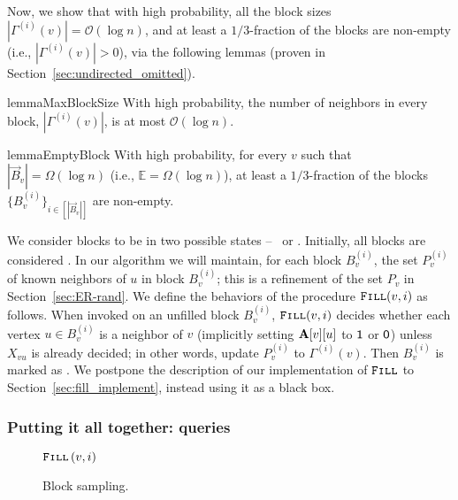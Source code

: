 Now, we show that with high probability, all the block sizes $|\Gamma^{(i)}(v)|=\mathcal{O}(\log n)$, and at least a $1/3$-fraction of the blocks are non-empty (i.e., $|\Gamma^{(i)}(v)|>0$), via the following lemmas (proven in Section~\ref{sec:undirected_omitted}).

\begin{restatable}{lemma}{MaxBlockSize}
\label{lem:MaxBlockSize}
With high probability, the number of neighbors in every block, $|\Gamma^{(i)}(v)|$, is at most $ \mathcal{O}(\log n)$.
\end{restatable}

\begin{restatable}{lemma}{EmptyBlock}
\label{lem:EmptyBlock}
With high probability, for every $v$ such that $|\vec B_v| = \Omega(\log n)$ (i.e., $\mathbb E = \Omega(\log n)$), at least a $1/3$-fraction of the blocks $\{B^{(i)}_v\}_{i\in[|\vec B_v|]}$ are non-empty.
\end{restatable}

We consider blocks to be in two possible states -- \filled~or \unfilled. Initially, all blocks are considered \unfilled.
In our algorithm we will maintain, for each block $B^{(i)}_v$, the set $P^{(i)}_v$ of known neighbors of $u$ in block $B^{(i)}_v$;
this is a refinement of the set $P_v$ in Section~\ref{sec:ER-rand}.
We define the behaviors of the procedure $\texttt{\textsc{Fill}}(v,i)$ as follows.
When invoked on an unfilled block $B^{(i)}_v$, $\texttt{\textsc{Fill}}(v,i)$ decides whether each vertex $u \in B^{(i)}_v$ is a neighbor of $v$
(implicitly setting $\mathbf{A}[v][u]$ to $\mathsf{1}$ or $\mathsf{0}$) unless $X_{vu}$ is already decided; in other words, update $P_v^{(i)}$ to $\Gamma^{(i)}(v)$.
Then $B^{(i)}_v$ is marked as \filled.
We postpone the description of our implementation of $\texttt{\textsc{Fill}}$ to Section~\ref{sec:fill_implement}, instead using it as a black box.





\subsubsection{Putting it all together:  queries}
\label{sec:random_neighbor}
\begin{wrapfigure}[10]{R}{0.47\textwidth}
\vspace{-1.75em}
\begin{framed}
    \renewcommand\figurename{Algorithm}
    \caption{Block sampling.}
    \label{alg:random}
    \begin{algorithmic}
                    \State$\texttt{\textsc{Fill}}\left( v,i\right)$
                \EndIf
            \EndWhile
        \EndProcedure
    \end{algorithmic}
\end{framed}
\end{wrapfigure}

